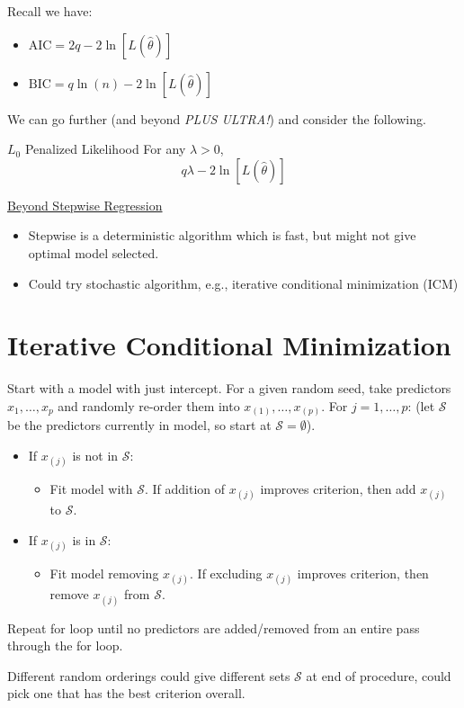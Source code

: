 Recall we have:
\begin{itemize}
      \item $ \text{AIC}=2q-2\ln[L(\hat{\theta})] $
      \item $ \text{BIC}=q\ln(n)-2\ln[L(\hat{\theta})] $
\end{itemize}
We can go further (and beyond \emph{PLUS ULTRA!}) and consider the following.
\begin{Definition}{$ L_0 $ Penalized Likelihood}{}
      For any $ \lambda>0 $,
      \[ q\lambda -2\ln[L(\hat{\theta})] \]
\end{Definition}
\underline{Beyond Stepwise Regression}
\begin{itemize}
      \item Stepwise is a deterministic algorithm which is fast,
            but might not give optimal model selected.
      \item Could try stochastic algorithm, e.g., iterative
            conditional minimization (ICM)
\end{itemize}

\section{Iterative Conditional Minimization}
Start with a model with just intercept.
For a given random seed, take predictors $ x_1,\ldots,x_p $
and randomly re-order them into $ x_{(1)},\ldots,x_{(p)} $.
For $ j=1,\ldots,p $: (let $ \mathcal{S} $ be the predictors
currently in model, so start at $ \mathcal{S}=\emptyset $).
\begin{itemize}
      \item If $ x_{(j)} $ is not in $ \mathcal{S} $:
            \begin{itemize}
                  \item Fit model with $ \mathcal{S} $.
                        If addition of $ x_{(j)} $ improves criterion,
                        then add $ x_{(j)} $ to $ \mathcal{S} $.
            \end{itemize}
      \item If $ x_{(j)} $ is in $ \mathcal{S} $:
            \begin{itemize}
                  \item Fit model removing $ x_{(j)} $. If excluding
                        $ x_{(j)} $ improves criterion, then remove
                        $ x_{(j)} $ from $ \mathcal{S} $.
            \end{itemize}
\end{itemize}
Repeat for loop until no predictors are added/removed
from an entire pass through the for loop.
\begin{Remark}{}{}
      Different random orderings could give different
      sets $ \mathcal{S} $ at end of procedure, could pick one
      that has the best criterion overall.
\end{Remark}
